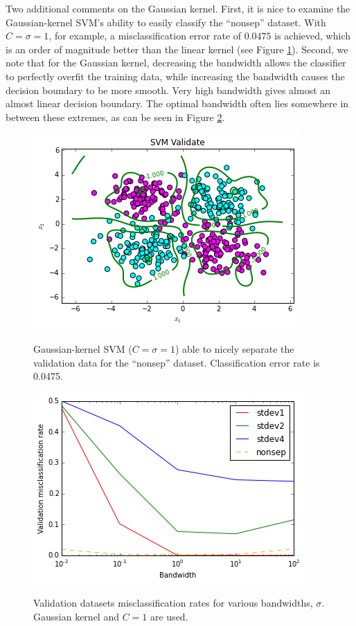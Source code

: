\documentclass[10pt]{article}
\begin{document}
Two additional comments on the Gaussian kernel.  First, it is nice to examine the Gaussian-kernel SVM's ability to easily classify the ``nonsep'' dataset.  With $C=\sigma=1$, for example, a misclassification error rate of $0.0475$ is achieved, which is an order of magnitude better than the linear kernel (see Figure \ref{nonsep_gaussian}).  Second, we note that for the Gaussian kernel, decreasing the bandwidth allows the classifier to perfectly overfit the training data, while increasing the bandwidth causes the decision boundary to be more smooth.  Very high bandwidth gives almost an almost linear decision boundary. The optimal bandwidth often lies somewhere in between these extremes, as can be seen in Figure \ref{bandwidth_cer}.
\begin{figure}
\centering
\includegraphics[scale=0.5]{nonsep_gaussian.png}
\label{nonsep_gaussian}
\caption{Gaussian-kernel SVM ($C=\sigma=1$) able to nicely separate the validation data for the ``nonsep'' dataset.  Classification error rate is 0.0475.}
\end{figure}
\begin{figure}
\centering
\includegraphics[scale=0.5]{bandwidth_cer.png}
\label{bandwidth_cer}
\caption{Validation datasets misclassification rates for various bandwidths, $\sigma$.  Gaussian kernel and $C=1$ are used.}
\end{figure}
\end{document}
